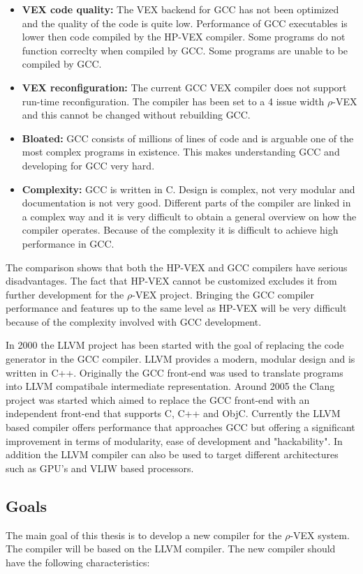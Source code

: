 \begin{itemize}
	\item \textbf{VEX code quality:} The VEX backend for GCC has not been optimized and the quality of the code is quite low. Performance of GCC executables is lower then code compiled by the HP-VEX compiler. Some programs do not function correclty when compiled by GCC. Some programs are unable to be compiled by GCC.
	\item \textbf{VEX reconfiguration:} The current GCC VEX compiler does not support run-time reconfiguration. The compiler has been set to a 4 issue width $\rho$-VEX and this cannot be changed without rebuilding GCC.	
	\item \textbf{Bloated:} GCC consists of millions of lines of code and is arguable one of the most complex programs in existence. This makes understanding GCC and developing for GCC very hard.
	\item \textbf{Complexity:} GCC is written in C. Design is complex, not very modular and documentation is not very good. Different parts of the compiler are linked in a complex way and it is very difficult to obtain a general overview on how the compiler operates. Because of the complexity it is difficult to achieve high performance in GCC.
\end{itemize}

The comparison shows that both the HP-VEX and GCC compilers have serious disadvantages. The fact that HP-VEX cannot be customized excludes it from further development for the $\rho$-VEX project. Bringing the GCC compiler performance and features up to the same level as HP-VEX will be very difficult because of the complexity involved with GCC development.  

In 2000 the LLVM project has been started with the goal of replacing the code generator in the GCC compiler. LLVM provides a modern, modular design and is written in C++. Originally the GCC front-end was used to translate programs into LLVM compatibale intermediate representation. Around 2005 the Clang project was started which aimed to replace the GCC front-end with an independent front-end that supports C, C++ and ObjC. Currently the LLVM based compiler offers performance that approaches GCC but offering a significant improvement in terms of modularity, ease of development and "hackability". In addition the LLVM compiler can also be used to target different architectures such as GPU's and VLIW based processors.

\subsection{Goals}
The main goal of this thesis is to develop a new compiler for the $\rho$-VEX system. The compiler will be based on the LLVM compiler. The new compiler should have the following characteristics:

